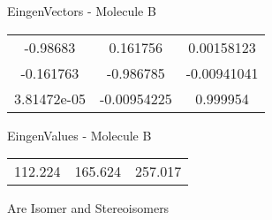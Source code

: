 \begin{multicols}{2}
\begin{center}
\vtab
 EingenVectors - Molecule B     \\
\vtab
\begin{tabular}{|c c c|}
-0.98683	 & 	0.161756	 & 	0.00158123	 \\
-0.161763	 & 	-0.986785	 & 	-0.00941041	 \\
3.81472e-05	 & 	-0.00954225	 & 	0.999954
\end{tabular}

\vtab
 EingenValues - Molecule B     \\
\vtab
\begin{tabular}{|c c c|}
112.224	 & 	165.624	 & 	257.017
\end{tabular}

\end{center}
\end{multicols}
\begin{center}
\vtab
\vtab
\textcolor{NavyBlue}{\Large Are Isomer and Stereoisomers}
\end{center}
\newpage

